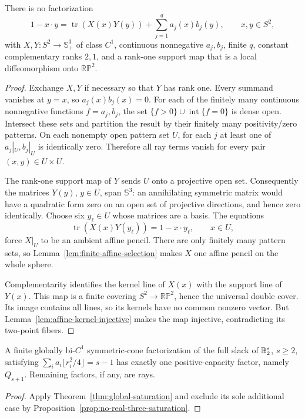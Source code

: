 \begin{proposition}
\label{prop:no-real-three-saturation}
There is no factorization
\[
 1-x\cdot y=\operatorname{tr}(X(x)Y(y))+\sum_{j=1}^q a_j(x)b_j(y),
 \qquad x,y\in S^2,
\]
with $X,Y:S^2\to\mathbb S_+^3$ of class $C^1$, continuous nonnegative
$a_j,b_j$, finite $q$, constant complementary ranks $2,1$, and a
rank-one support map that is a local diffeomorphism onto $\mathbb{RP}^2$.
\end{proposition}
\begin{proof}
Exchange $X,Y$ if necessary so that $Y$ has rank one. Every summand
vanishes at $y=x$, so $a_j(x)b_j(x)=0$. For each of the finitely many
continuous nonnegative functions $f=a_j,b_j$, the set
$\{f>0\}\cup\operatorname{int}\{f=0\}$ is dense open. Intersect these
sets and partition the result by their finitely many positivity/zero
patterns. On each nonempty open pattern set $U$, for each $j$ at least
one of $a_j|_U,b_j|_U$ is identically zero. Therefore all ray terms vanish
for every pair $(x,y)\in U\times U$.

The rank-one support map of $Y$ sends $U$ onto a projective open set.
Consequently the matrices $Y(y)$, $y\in U$, span $\mathbb S^3$: an
annihilating symmetric matrix would have a quadratic form zero on an open
set of projective directions, and hence zero identically. Choose six
$y_\ell\in U$ whose matrices are a basis. The equations
\[
 \operatorname{tr}(X(x)Y(y_\ell))=1-x\cdot y_\ell,
 \qquad x\in U,
\]
force $X|_U$ to be an ambient affine pencil. There are only finitely many
pattern sets, so Lemma~\ref{lem:finite-affine-selection} makes $X$ one
affine pencil on the whole sphere.

Complementarity identifies the kernel line of $X(x)$ with the support
line of $Y(x)$. This map is a finite covering $S^2\to\mathbb{RP}^2$,
hence the universal double cover. Its image contains all lines, so its
kernels have no common nonzero vector. But
Lemma~\ref{lem:affine-kernel-injective} makes the map injective,
contradicting its two-point fibers.
\end{proof}

\begin{corollary}
\label{cor:ball-global-saturation}
A finite globally bi-$C^1$ symmetric-cone factorization of the full slack
of $\mathbb B_2^s$, $s\geq2$, satisfying
$\sum_i a_i\lfloor r_i^2/4\rfloor=s-1$ has exactly one
positive-capacity factor, namely $Q_{s+1}$. Remaining factors, if any,
are rays.
\end{corollary}
\begin{proof}
Apply Theorem~\ref{thm:global-saturation} and exclude its sole additional
case by Proposition~\ref{prop:no-real-three-saturation}.
\end{proof}


